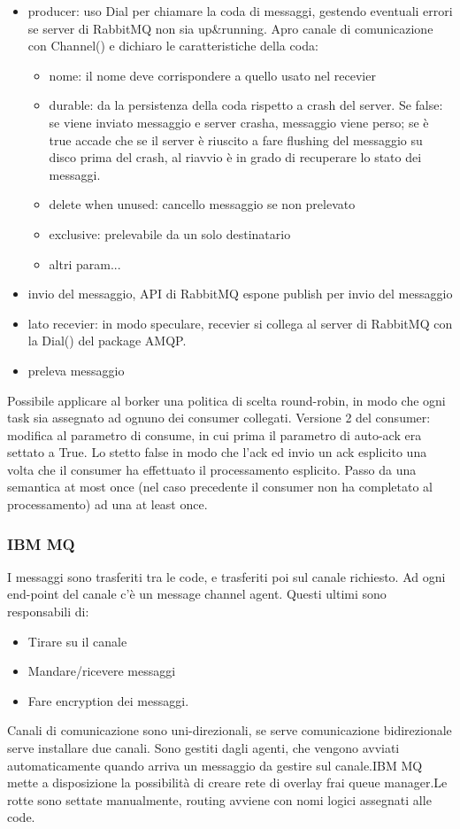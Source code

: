 \documentclass{article}
\begin{document}
\begin{itemize}
\item producer: uso Dial per chiamare la coda di messaggi, gestendo eventuali errori se server di RabbitMQ non sia up\&running. Apro canale di comunicazione con Channel() e dichiaro le caratteristiche della coda:
\begin{itemize}
\item nome: il nome deve corrispondere a quello usato nel recevier
\item durable: da la persistenza della coda rispetto a crash del server. Se false: se viene inviato messaggio e server crasha, messaggio viene perso; se è true accade che se il server è riuscito a fare flushing del messaggio su disco prima del crash, al riavvio è in grado di recuperare lo stato dei messaggi.
\item delete when unused: cancello messaggio se non prelevato
\item exclusive: prelevabile da un solo destinatario
\item altri param... 
\end{itemize}
\item invio del messaggio, API di RabbitMQ espone publish per invio del messaggio
\item lato recevier: in modo speculare, recevier si collega al server di RabbitMQ con la Dial() del package AMQP.
\item preleva messaggio
\end{itemize}
Possibile applicare al borker una politica di scelta round-robin, in modo che ogni task sia assegnato ad ognuno dei consumer collegati. Versione 2 del consumer: modifica al parametro di consume, in cui prima il parametro di auto-ack era settato a True. Lo stetto false in modo che l'ack ed invio un ack esplicito una volta che il consumer ha effettuato il processamento esplicito. Passo da una semantica at most once (nel caso precedente il consumer non ha completato al processamento) ad una at least once.
\subsubsection{IBM MQ}
I messaggi sono trasferiti tra le code, e trasferiti poi sul canale richiesto. Ad ogni end-point del canale c'è un message channel agent. Questi ultimi sono responsabili di:
\begin{itemize}
\item Tirare su il canale
\item Mandare/ricevere messaggi
\item Fare encryption dei messaggi.
\end{itemize}
Canali di comunicazione sono uni-direzionali, se serve comunicazione bidirezionale serve installare due canali. Sono gestiti dagli agenti, che vengono avviati automaticamente quando arriva un messaggio da gestire sul canale.IBM MQ mette a disposizione la possibilità di creare rete di overlay frai queue manager.Le rotte sono settate manualmente, routing avviene con nomi logici assegnati alle code.
\end{document}
